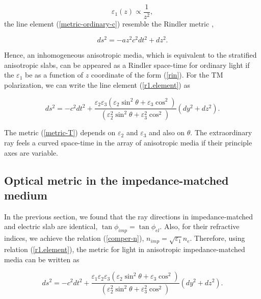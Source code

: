 \documentclass[9pt,twocolumn,twoside]{osajnl}
\begin{document}
\begin{equation}\label{rin}
\varepsilon_{1}(z)\propto \frac{1}{z^{2}},
\end{equation}
the line element (\ref{metric-ordinary-c}) resemble the Rindler metric \cite{carroll2004spacetime},

\begin{equation}\label{rindler}
ds^{2}=-az^2c^{2}dt^{2} + dz^2.
\end{equation}

Hence, an inhomogeneous anisotropic media, which is equivalent to the stratified anisotropic slabs, can be appeared as a Rindler space-time for ordinary light if  the $\varepsilon_{1}$ be as a function of $z$ coordinate of the form (\ref{rin}). 
For the TM polarization,  we can write the line element (\ref{r1.element}) as 

\begin{equation}\label{metric-T}
ds^{2}=- c^{2}dt^{2}+\dfrac{\varepsilon_{2}\varepsilon_{3}\left({\varepsilon_{2} \sin^{2}{\theta} + \varepsilon_{3}\cos^{2}}\right)}{\left({\varepsilon_{2}^{2} \sin^{2}{\theta} + \varepsilon_{3}^{2}\cos^{2}}\right)}{(dy^{2}+dz^{2})}.
\end{equation}

The metric (\ref{metric-T})  depends on $\varepsilon_{2}$  and $\varepsilon_{3}$ and also on $\theta$.
The extraordinary ray feels a curved space-time in the array of anisotropic media if their principle axes are variable. 

 \subsection{Optical metric in the impedance-matched medium}
 
In the previous section, we found that the ray directions in impedance-matched and electric slab are identical, $\tan{\phi}_{imp}=\tan{\phi}_{el}$.
Also, for their refractive indices, we  achieve the relation (\ref{comper-n}), $ n_{imp}=\sqrt{\varepsilon_{1}}n_{e}$.  Therefore, using relation (\ref{r1.element}), the metric for light in anisotropic impedance-matched media can be written as 

\begin{equation}\label{metric-im}
ds^{2}=- c^{2}dt^{2}+\dfrac{\varepsilon_{1}\varepsilon_{2}\varepsilon_{3}\left({\varepsilon_{2} \sin^{2}{\theta} + \varepsilon_{3}\cos^{2}}\right)}{\left({\varepsilon_{2}^{2} \sin^{2}{\theta} + \varepsilon_{3}^{2}\cos^{2}}\right)} {(dy^{2}+dz^{2})}.
\end{equation}
\end{document}
